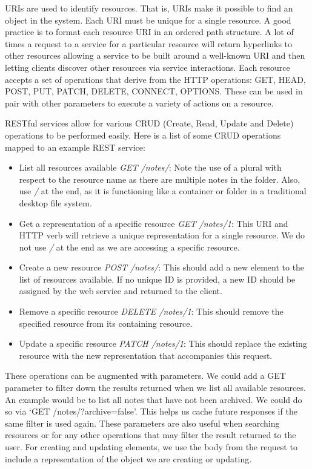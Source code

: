 URIs are used to identify resources. That is, URIs make it possible to find an object in the system. Each URI must be unique for a single resource. A good practice is to format each resource URI in an ordered path structure. A lot of times a request to a service for a particular resource will return hyperlinks to other resources allowing a service to be built around a well-known URI and then letting clients discover other resources via service interactions. Each resource accepts a set of operations that derive from the HTTP operations: GET, HEAD, POST, PUT, PATCH, DELETE, CONNECT, OPTIONS. These can be used in pair with other parameters to execute a variety of actions on a resource. 

RESTful services allow for various CRUD (Create, Read, Update and Delete) operations to be performed easily. Here is a list of some CRUD operations mapped to an example REST service:

\begin{itemize}
    \item List all resources available \textit{GET /notes/}: Note the use of a plural with respect to the resource name as there are multiple notes in the folder. Also, use \textit{/} at the end, as it is functioning like a container or folder in a traditional desktop file system.

    \item Get a representation of a specific resource \textit{GET /notes/1}: This URI and HTTP verb will retrieve a unique representation for a single resource. We do not use \textit{/} at the end as we are accessing a specific resource.

    \item Create a new resource \textit{POST /notes/}: This should add a new element to the list of resources available. If no unique ID is provided, a new ID should be assigned by the web service and returned to the client. 

    \item Remove a specific resource \textit{DELETE /notes/1}: This should remove the specified resource from its containing resource. 

    \item Update a specific resource \textit{PATCH /notes/1}: This should replace the existing resource with the new representation that accompanies this request.

\end{itemize}

These operations can be augmented with parameters. We could add a GET parameter to filter down the results returned when we list all available resources. An example would be to list all notes that have not been archived. We could do so via ‘GET /notes/?archive=false’. This helps us cache future responses if the same filter is used again. These parameters are also useful when searching resources or for any other operations that may filter the result returned to the user. For creating and updating elements, we use the body from the request to include a representation of the object we are creating or updating. 


